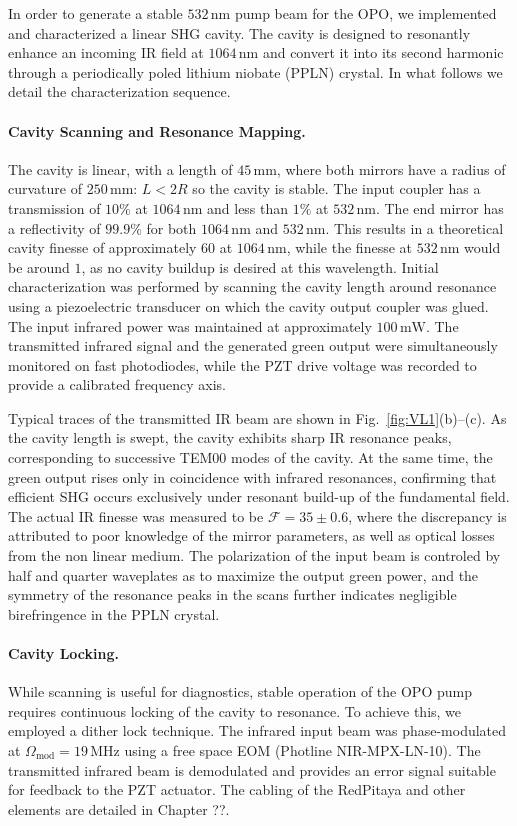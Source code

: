 In order to generate a stable $532\,\mathrm{nm}$ pump beam for the OPO, we implemented and characterized a linear SHG cavity. The cavity is designed to resonantly enhance an incoming IR field at $1064\,\mathrm{nm}$ and convert it into its second harmonic through a periodically poled lithium niobate (PPLN) crystal. In what follows we detail the characterization sequence.

\paragraph{Cavity Scanning and Resonance Mapping.}
The cavity is linear, with a length of $45 \, \text{mm}$, where both mirrors have a radius of curvature of $250 \, \text{mm}$: $L<2R$ so the cavity is stable. The input coupler has a transmission of $10 \%$ at $1064 \, \text{nm}$ and less than $1 \%$ at $532 \, \text{nm}$. The end mirror has a reflectivity of $99.9 \%$ for both $1064 \, \text{nm}$ and $532 \, \text{nm}$. This results in a theoretical cavity finesse of approximately $60$ at $1064 \, \text{nm}$, while the finesse at $532 \, \text{nm}$ would be around $1$, as no cavity buildup is desired at this wavelength.
Initial characterization was performed by scanning the cavity length around resonance using a piezoelectric transducer on which the cavity output coupler was glued. The input infrared power was maintained at approximately $100\,\mathrm{mW}$. The transmitted infrared signal and the generated green output were simultaneously monitored on fast photodiodes, while the PZT drive voltage was recorded to provide a calibrated frequency axis. 

Typical traces of the transmitted IR beam are shown in Fig.~\ref{fig:VL1}(b)–(c). As the cavity length is swept, the cavity exhibits sharp IR resonance peaks, corresponding to successive TEM00 modes of the cavity. At the same time, the green output rises only in coincidence with infrared resonances, confirming that efficient SHG occurs exclusively under resonant build-up of the fundamental field. The actual IR finesse was measured to be $\mathcal{F} = 35 \pm 0.6$, where the discrepancy is attributed to poor knowledge of the mirror parameters, as well as optical losses from the non linear medium. The polarization of the input beam is controled by half and quarter waveplates as to maximize the output green power, and the symmetry of the resonance peaks in the scans further indicates negligible birefringence in the PPLN crystal.


\paragraph{Cavity Locking.}
While scanning is useful for diagnostics, stable operation of the OPO pump requires continuous locking of the cavity to resonance. To achieve this, we employed a dither lock technique. The infrared input beam was phase-modulated at $\Omega_\mathrm{mod} = 19\,\mathrm{MHz}$ using a free space EOM (Photline NIR-MPX-LN-10). The transmitted infrared beam is demodulated and provides an error signal suitable for feedback to the PZT actuator. The cabling of the RedPitaya and other elements are detailed in Chapter ??.



